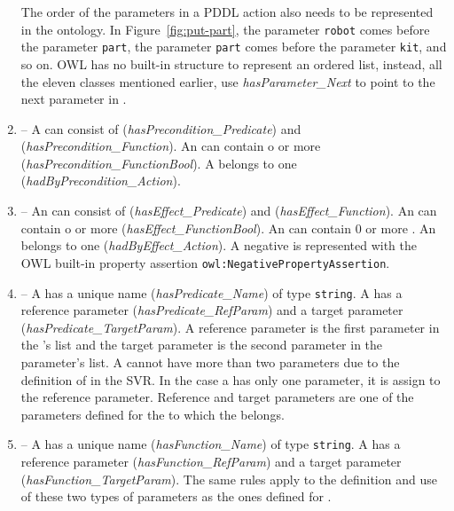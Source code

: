 \begin{enumerate}
    The order of the parameters in a PDDL action also needs to be represented in the ontology. In Figure~\ref{fig:put-part}, the parameter \texttt{robot} comes before the parameter \texttt{part}, the parameter \texttt{part} comes before the parameter \texttt{kit}, and so on. OWL has no built-in structure to represent an ordered list, instead, all the eleven classes mentioned earlier, use \emph{hasParameter\_Next} to point to the next parameter in .
\item {} -- A  can consist of  (\emph{hasPrecondition\_Predicate}) and  (\emph{hasPrecondition\_Function}). An  can contain o or more  (\emph{hasPrecondition\_FunctionBool}). A  belongs to one  (\emph{hadByPrecondition\_Action}).
\item {} -- An  can consist of  (\emph{hasEffect\_Predicate}) and  (\emph{hasEffect\_Function}). An  can contain o or more  (\emph{hasEffect\_FunctionBool}). An  can contain 0 or more . An  belongs to one  (\emph{hadByEffect\_Action}). A negative  is represented with the OWL built-in property assertion \texttt{owl:NegativePropertyAssertion}.
\item {} -- A  has a unique name (\emph{hasPredicate\_Name}) of type \texttt{string}. A  has a reference parameter (\emph{hasPredicate\_RefParam}) and a target parameter (\emph{hasPredicate\_TargetParam}). A reference parameter is the first parameter in the 's list and the target parameter is the second parameter in the parameter's list. A  cannot have more than two parameters due to the definition of  in the SVR. In the case a  has only one parameter, it is assign to the reference parameter. Reference and target parameters are one of the parameters defined for the  to which the  belongs.
\item {} -- A  has a unique name (\emph{hasFunction\_Name}) of type \texttt{string}. A  has a reference parameter (\emph{hasFunction\_RefParam}) and a target parameter (\emph{hasFunction\_TargetParam}). The same rules apply to the definition and use of these two types of parameters as the ones defined for .

\end{enumerate}
